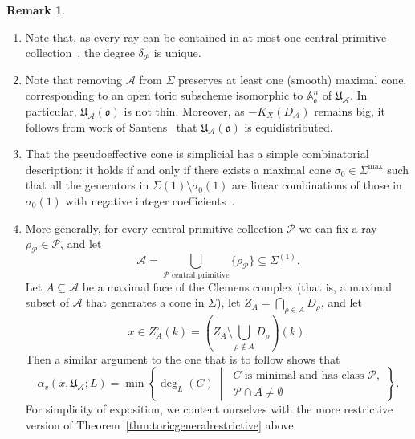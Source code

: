 \documentclass[a4paper, twoside, 11pt]{amsart}
\theoremstyle{definition}
\newtheorem{remark}[theorem]{Remark}
\newcommand{\CA}{{\mathcal{A}}}
\newcommand{\cA}{\mathcal{A}}
\newcommand{\cP}{\mathcal{P}}
\newcommand{\mU}{\mathfrak{U}}
\newcommand{\fo}{\mathfrak{o}}
\newcommand{\dA}{\mathbb{A}}
\begin{document}
\begin{remark}\label{rmk:toric}
\begin{enumerate}
    \item Note that, as every ray can be contained in at most one central primitive collection~\cite[Lem.~6.4]{HuangANT}, the degree $\delta_\cP$ is unique.   
        \item Note that removing $\cA$ from $\Sigma$ preserves at least one (smooth) maximal cone, corresponding to an open toric subscheme isomorphic to $\dA_\fo^n$ of $\mU_\cA$. In particular, $\mU_{\cA}(\fo)$ is not thin.
        Moreover, as $-K_X(D_{\CA})$ remains big, it follows from work of Santens~\cite[Thm.~1.1]{Santens} that $\mU_{\cA}(\fo)$ is equidistributed.
        \item\label{enum:simplicial-eff} That the pseudoeffective cone is simplicial has a simple combinatorial description: it holds if and only if there exists a maximal cone $\sigma_0\in\Sigma^{\max}$ such that all the generators in $\Sigma(1)\setminus\sigma_0(1)$ are linear combinations of those in $\sigma_0(1)$ with negative integer coefficients~\cite[Lem.~6.3]{HuangANT}.
    \item More generally, for every central primitive collection $\cP$ we can fix a ray $\rho_{\cP}\in\cP$, and let $$\cA=\bigcup_{\cP\text{ central primitive}}\{\rho_{\cP}\}\subseteq \Sigma^{(1)}.$$ Let $A\subseteq \cA$ be a maximal face of the Clemens complex (that is, a maximal subset of $\cA$ that generates a cone in $\Sigma$),  
         let $Z_{A}=\bigcap_{\rho\in A}D_{\rho}$, and let
		\begin{equation*}
			x\in Z_A^\circ(k)=(Z_A\setminus\bigcup_{\rho\notin A}D_{\rho})(k).
		\end{equation*}
		Then a similar argument to the one that is to follow shows that
		\begin{equation*}
			\alpha_v(x,\mU_{\cA};L)=\min\left\{\deg_L(C)\ \middle|\ 
			\substack{C\text{ is minimal and has class }\cP, \\ \cP\cap A\neq\emptyset} 
			\right\}.
		\end{equation*}
		 For simplicity of exposition, we content ourselves with the more restrictive version of Theorem~\ref{thm:toricgeneralrestrictive} above.
\end{enumerate}
    
\end{remark}
\end{document}
